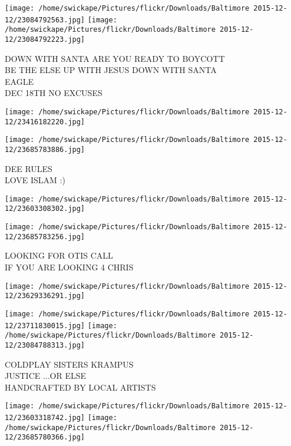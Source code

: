 \documentclass[10pt,letterpaper]{article}
\begin{document}
\texttt{[image: /home/swickape/Pictures/flickr/Downloads/Baltimore 2015-12-12/23084792563.jpg]}
\texttt{[image: /home/swickape/Pictures/flickr/Downloads/Baltimore 2015-12-12/23084792223.jpg]}

DOWN WITH SANTA ARE YOU READY TO BOYCOTT\\
BE THE ELSE UP WITH JESUS DOWN WITH SANTA\\
EAGLE\\
DEC 18TH NO EXCUSES\\
\pagebreak

\texttt{[image: /home/swickape/Pictures/flickr/Downloads/Baltimore 2015-12-12/23416182220.jpg]}

\vspace{0.25in}
\texttt{[image: /home/swickape/Pictures/flickr/Downloads/Baltimore 2015-12-12/23685783886.jpg]}

DEE RULES\\
LOVE ISLAM :)\\
\pagebreak

\texttt{[image: /home/swickape/Pictures/flickr/Downloads/Baltimore 2015-12-12/23603308302.jpg]}

\vspace{0.25in}
\texttt{[image: /home/swickape/Pictures/flickr/Downloads/Baltimore 2015-12-12/23685783256.jpg]}

LOOKING FOR OTIS CALL\\
IF YOU ARE LOOKING 4 CHRIS\\
\pagebreak

\texttt{[image: /home/swickape/Pictures/flickr/Downloads/Baltimore 2015-12-12/23629336291.jpg]}

\vspace{0.25in}
\texttt{[image: /home/swickape/Pictures/flickr/Downloads/Baltimore 2015-12-12/23711830015.jpg]}
\texttt{[image: /home/swickape/Pictures/flickr/Downloads/Baltimore 2015-12-12/23084788313.jpg]}

COLDPLAY SISTERS KRAMPUS\\
JUSTICE ...OR ELSE\\
HANDCRAFTED BY LOCAL ARTISTS\\
\pagebreak

\texttt{[image: /home/swickape/Pictures/flickr/Downloads/Baltimore 2015-12-12/23603318742.jpg]}
\texttt{[image: /home/swickape/Pictures/flickr/Downloads/Baltimore 2015-12-12/23685780366.jpg]}
\end{document}
